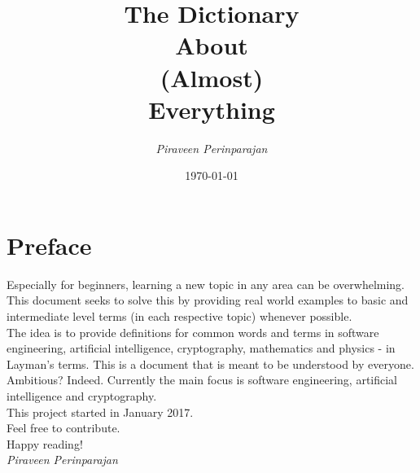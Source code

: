 \documentclass[12pt]{report}
\begin{document}
\begin{titlepage}
\title{\textbf{The Dictionary \\ About \\ (Almost) \\ Everything} }
\author{\textit{Piraveen Perinparajan}}
\date{\monthyeardate\today}
\end{titlepage}
\maketitle



\chapter*{Preface}  %
Especially for beginners, learning a new topic in any area can be overwhelming. This document seeks to solve this by providing real world examples to basic and intermediate level terms (in each respective topic) whenever possible. \\

\noindent The idea is to provide definitions for common words and terms in software engineering, artificial intelligence, cryptography, mathematics and physics - in Layman's terms. This is a document that is meant to be understood by everyone. Ambitious? Indeed. Currently the main focus is software engineering, artificial intelligence and cryptography. \\



\noindent This project started in January 2017. \\
\noindent Feel free to contribute.\\

\noindent Happy reading! \\

\noindent \textit{Piraveen Perinparajan}
\end{document}
